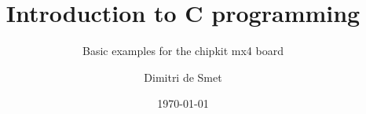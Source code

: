 \documentclass{beamer}
\title{Introduction to C programming}
\subtitle{Basic examples for the chipkit mx4 board}
\author{Dimitri de Smet}
\institute{UCL}
\date{\today}
\begin{document}

\begin{frame}
\titlepage
\end{frame}






\end{document}
